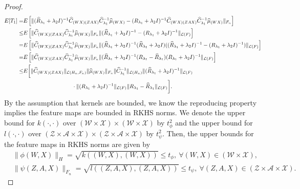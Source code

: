\begin{proof}
    \begin{align}
        \label{eq: est_consistency1}
        E[T_1] =& E\left[\|(\widehat{R}_{\lambda_1}+\lambda_2I)^{-1}\widehat{C}_{(WX)(ZAX)}\widehat{C}^{-1}_{\lambda_1}\widehat{\mu}_{(WX)}-(R_{\lambda_1}+\lambda_2I)^{-1}\widehat{C}_{(WX)(ZAX)}\widehat{C}^{-1}_{\lambda_1}\widehat{\mu}_{(WX)}\|_{F_n}\right] \notag\\
            \leq& E\left[\|\widehat{C}_{(WX)(ZAX)}\widehat{C}^{-1}_{\lambda_1}\widehat{\mu}_{(WX)}\|_{F_n} \|(\widehat{R}_{\lambda_1}+\lambda_2I)^{-1}-(R_{\lambda_1}+\lambda_2I)^{-1}\|_{\mathcal{L}(F)}\right] \notag\\
            =& E\left[\|\widehat{C}_{(WX)(ZAX)}\widehat{C}^{-1}_{\lambda_1}\widehat{\mu}_{(WX)}\|_{F_n} \|(\widehat{R}_{\lambda_1}+\lambda_2I)^{-1}(\widehat{R}_{\lambda_1}+\lambda_2I)((\widehat{R}_{\lambda_1}+\lambda_2I)^{-1}-(R_{\lambda_1}+\lambda_2I)^{-1})\|_{\mathcal{L}(F)}\right] \notag\\
            =& E\left[\|\widehat{C}_{(WX)(ZAX)}\widehat{C}^{-1}_{\lambda_1}\widehat{\mu}_{(WX)}\|_{F_n} \|(\widehat{R}_{\lambda_1}+\lambda_2I)^{-1}(R_{\lambda_1}-\widehat{R}_{\lambda_1})(R_{\lambda_1}+\lambda_2I)^{-1}\|_{\mathcal{L}(F)}\right] \notag\\
            \leq& E\bigg[\|\widehat{C}_{(WX)(ZAX)}\|_{\mathcal{L}(H_n,F_n)}\|\widehat{\mu}_{(WX)}\|_{F_n} \|\widehat{C}^{-1}_{\lambda_1}\|_{\mathcal{L}(H_n)}\|(\widehat{R}_{\lambda_1}+\lambda_2I)^{-1}\|_{\mathcal{L}(F)} \notag\\
            &\phantom{\|\widehat{C}_{(WX)(ZAX)}\|_{\mathcal{L}(H_n)}} \cdot \|(R_{\lambda_1}+\lambda_2I)^{-1}\|_{\mathcal{L}(F)} \|R_{\lambda_1}-\widehat{R}_{\lambda_1}\|_{\mathcal{L}(F)}\bigg]. 
    \end{align}
    By the assumption that kernels are bounded, we know the reproducing property implies the feature maps are bounded in RKHS norms. 
    We denote the upper bound for $k(\cdot,\cdot)$ over $(\mathcal{W}\times\mathcal{X})\times(\mathcal{W}\times\mathcal{X})$ by $t^2_{\phi}$
    and the upper bound for $l(\cdot,\cdot)$ over $(\mathcal{Z}\times\mathcal{A}\times\mathcal{X})\times(\mathcal{Z}\times\mathcal{A}\times\mathcal{X})$ by $t^2_{\psi}$. 
    Then, the upper bounds for the feature maps in RKHS norms are given by 
    \begin{align*}
        &\|\phi(W,X)\|_H = \sqrt{k((W,X),(W,X))} \leq t_{\phi},\ \forall (W,X)\in(\mathcal{W}\times\mathcal{X}), \\
        &\|\psi(Z,A,X)\|_{F_n} = \sqrt{l((Z,A,X),(Z,A,X))} \leq t_{\psi},\ \forall (Z,A,X)\in(\mathcal{Z}\times\mathcal{A}\times\mathcal{X}). 

\end{align*}
\end{proof}
